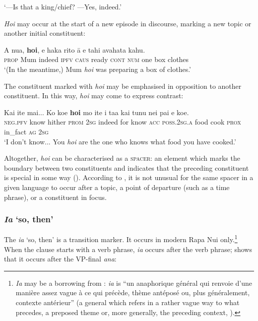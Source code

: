 \glt
‘—Is that a king/chief? —Yes, indeed.’ \textstyleExampleref{[R415.033]} 
\z

\textit{Ho{\ꞌ}i} may occur at the start of a new episode in discourse, marking a new topic or another initial constituent:

\ea\label{ex:4.168}
\gll A nua, \textbf{ho{\ꞌ}i}, e haka rito {\ꞌ}ā e tahi {\ꞌ}avahata kahu. \\
\textsc{prop} Mum indeed \textsc{ipfv} \textsc{caus} ready \textsc{cont} \textsc{num} one box clothes \\

\glt
‘(In the meantime,) Mum \textit{ho{\ꞌ}i} was preparing a box of clothes.’ \textstyleExampleref{[R210.027]} 
\z

The constituent marked with \textit{ho{\ꞌ}i} may be emphasised in opposition to another constituent. In this way, \textit{ho{\ꞌ}i} may come to express contrast:

\ea\label{ex:4.169}
\gll Kai {\ꞌ}ite mai... Ko koe \textbf{ho{\ꞌ}i} mo {\ꞌ}ite i ta{\ꞌ}a kai tunu nei  pa{\ꞌ}i e koe.\\
\textsc{neg.pfv} know hither \textsc{prom} \textsc{2sg} indeed for know \textsc{acc} \textsc{poss.2sg.a} food cook \textsc{prox}  in\_fact \textsc{ag} \textsc{2sg}\\

\glt
‘I don’t know... You \textit{ho{\ꞌ}i} are the one who knows what food you have cooked.’ \textstyleExampleref{[R236.029–030]}
\z

Altogether, \textit{ho{\ꞌ}i} can be characterised as a \textsc{spacer}: an element which marks the boundary between two constituents and indicates that the preceding constituent is special in some way (\citealt[37]{DooleyLevinsohn2001}). According to \citet[74]{Levinsohn2007}, it is not unusual for the same spacer in a given language to occur after a topic, a point of departure (such as a time phrase), or a constituent in focus.
\subsubsection{\textit{Ia} ‘so, then’}\label{sec:4.5.4.3}

The  \textit{ia} ‘so, then’ is a transition marker. It occurs in modern Rapa Nui only.\footnote{\label{fn:204}\textit{Ia} may be a borrowing from :  \textit{ia} is “un anaphorique général qui renvoie d’une manière assez vague à ce qui précède, thème antéposé ou, plus généralement, contexte antérieur” (a general  which refers in a rather vague way to what precedes, a preposed theme or, more generally, the preceding context, \citealt[118]{LazardPeltzer2000}).} When the clause starts with a verb phrase, \textit{ia} occurs after the verb phrase;  shows that it occurs after the VP{}-final  \textit{{\ꞌ}ana}:

